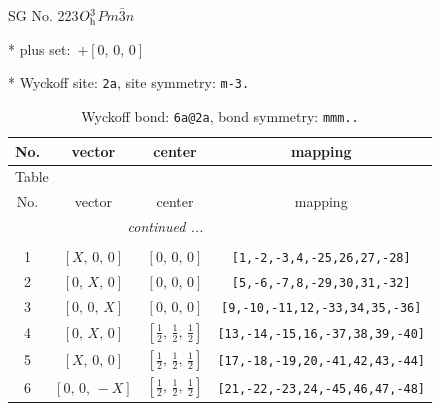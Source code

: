 \documentclass[fleqn,8pt]{jsarticle}
\begin{document}
\setcounter{MaxMatrixCols}{32}

\renewcommand{\tablename}{Table~}
\renewcommand{\figurename}{Figure~}
\begin{center}
\LARGE
SG No. 223\quad$O_{\rm h}^{3}$\quad$Pm\bar{3}n$\quad[ cubic ]
\end{center}

* plus set:\,\,\,$+\left[ 0,\, 0,\, 0 \right]$


* Wyckoff site: {\tt 2a}, site symmetry: {\tt m-3.}
\renewcommand{\arraystretch}{1.2}
\begin{longtable}{cccc}
\caption{Wyckoff bond: {\tt 6a@2a}, bond symmetry: {\tt mmm..}}
 \\
 \hline \hline
No. & vector & center & mapping \\ \hline \endfirsthead

\multicolumn{3}{l}{\tablename\ \thetable{}} \\
 \hline \hline
No. & vector & center & mapping \\ \hline \endhead

 \hline \hline
\multicolumn{3}{r}{\footnotesize\it continued ...} \\ \endfoot

 \hline \hline
\multicolumn{3}{r}{} \\ \endlastfoot

1 & $\left[ X,\, 0,\, 0 \right]$ & $\left[ 0,\, 0,\, 0 \right]$ & {\tt [1,-2,-3,4,-25,26,27,-28]} \\ \hline
2 & $\left[ 0,\, X,\, 0 \right]$ & $\left[ 0,\, 0,\, 0 \right]$ & {\tt [5,-6,-7,8,-29,30,31,-32]} \\ \hline
3 & $\left[ 0,\, 0,\, X \right]$ & $\left[ 0,\, 0,\, 0 \right]$ & {\tt [9,-10,-11,12,-33,34,35,-36]} \\ \hline
4 & $\left[ 0,\, X,\, 0 \right]$ & $\left[ \frac{1}{2},\, \frac{1}{2},\, \frac{1}{2} \right]$ & {\tt [13,-14,-15,16,-37,38,39,-40]} \\ \hline
5 & $\left[ X,\, 0,\, 0 \right]$ & $\left[ \frac{1}{2},\, \frac{1}{2},\, \frac{1}{2} \right]$ & {\tt [17,-18,-19,20,-41,42,43,-44]} \\ \hline
6 & $\left[ 0,\, 0,\, - X \right]$ & $\left[ \frac{1}{2},\, \frac{1}{2},\, \frac{1}{2} \right]$ & {\tt [21,-22,-23,24,-45,46,47,-48]} \\
\end{longtable}
\renewcommand{\arraystretch}{1.2}
\end{document}
